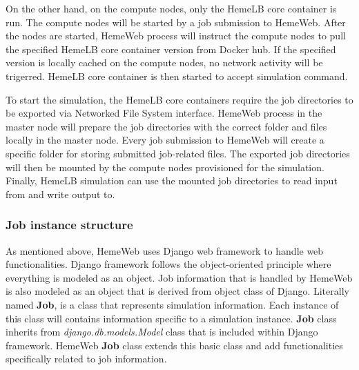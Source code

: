 On the other hand, on the compute nodes, only the HemeLB core container is run. The compute nodes will be started by a job submission to HemeWeb. After the nodes are started, HemeWeb process will instruct the compute nodes to pull the specified HemeLB core container version from Docker hub. If the specified version is locally cached on the compute nodes, no network activity will be trigerred. HemeLB core container is then started to accept simulation command.

To start the simulation, the HemeLB core containers require the job directories to be exported via Networked File System interface. HemeWeb process in the master node will prepare the job directories with the correct folder and files locally in the master node. Every job submission to HemeWeb will create a specific folder for storing submitted job-related files. The exported job directories will then be mounted by the compute nodes provisioned for the simulation. Finally, HemeLB simulation can use the mounted job directories to read input from and write output to.


\subsubsection{Job instance structure}

As mentioned above, HemeWeb uses Django web framework to handle web functionalities. Django framework follows the object-oriented principle where everything is modeled as an object. Job information that is handled by HemeWeb is also modeled as an object that is derived from object class of Django. Literally named \textbf{Job}, is a class that represents simulation information. Each instance of this class will contains information specific to a simulation instance. \textbf{Job} class inherits from \textit{django.db.models.Model} class that is included within Django framework. HemeWeb \textbf{Job} class extends this basic class and add functionalities specifically related to job information.


